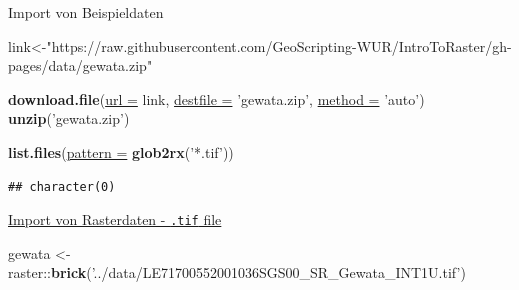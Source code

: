 \documentclass[ignorenonframetext,]{beamer}
\newenvironment{Shaded}{\begin{snugshade}}{\end{snugshade}}
\newcommand{\DataTypeTok}[1]{\textcolor[rgb]{0.74,0.68,0.62}{\underline{#1}}}
\newcommand{\KeywordTok}[1]{\textcolor[rgb]{0.26,0.66,0.93}{\textbf{#1}}}
\newcommand{\NormalTok}[1]{\textcolor[rgb]{0.74,0.68,0.62}{#1}}
\newcommand{\OperatorTok}[1]{\textcolor[rgb]{0.74,0.68,0.62}{#1}}
\newcommand{\StringTok}[1]{\textcolor[rgb]{0.02,0.61,0.04}{#1}}
\begin{document}
\begin{frame}[fragile]{Import von Beispieldaten}
\protect\hypertarget{import-von-beispieldaten}{}

\begin{Shaded}
\begin{Highlighting}[]
\NormalTok{link<-}\StringTok{"https://raw.githubusercontent.com/GeoScripting-WUR/IntroToRaster/gh-pages/data/gewata.zip"}
\end{Highlighting}
\end{Shaded}

\begin{Shaded}
\begin{Highlighting}[]
\KeywordTok{download.file}\NormalTok{(}\DataTypeTok{url =}\NormalTok{ link, }\DataTypeTok{destfile =} \StringTok{'gewata.zip'}\NormalTok{, }\DataTypeTok{method =} \StringTok{'auto'}\NormalTok{)}
\KeywordTok{unzip}\NormalTok{(}\StringTok{'gewata.zip'}\NormalTok{)}
\end{Highlighting}
\end{Shaded}

\begin{Shaded}
\begin{Highlighting}[]
\KeywordTok{list.files}\NormalTok{(}\DataTypeTok{pattern =} \KeywordTok{glob2rx}\NormalTok{(}\StringTok{'*.tif'}\NormalTok{))}
\end{Highlighting}
\end{Shaded}

\begin{verbatim}
## character(0)
\end{verbatim}

\end{frame}

\begin{frame}[fragile]{\href{https://geoscripting-wur.github.io/IntroToRaster/}{Import
von Rasterdaten - \texttt{.tif} file}}
\protect\hypertarget{import-von-rasterdaten---.tif-file}{}

\begin{Shaded}
\begin{Highlighting}[]
\NormalTok{gewata <-}\StringTok{ }\NormalTok{raster}\OperatorTok{::}\KeywordTok{brick}\NormalTok{(}\StringTok{'../data/LE71700552001036SGS00_SR_Gewata_INT1U.tif'}\NormalTok{)}
\end{Highlighting}
\end{Shaded}

\end{frame}
\end{document}
